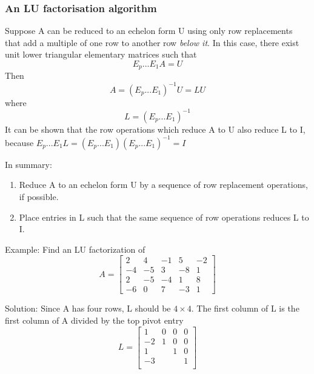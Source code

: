 \documentclass[12pt]{article} %
\begin{document}
\subsubsection{An LU factorisation algorithm}
Suppose A can be reduced to an echelon form U using only row replacements that add a multiple of one row to another row \emph{below it}. In this case, there exist unit lower triangular elementary matrices such that 
$$E_p ... E_1A = U$$
Then 
$$A = (E_p ... E_1)^{-1}U = LU$$
where 
$$L = (E_p ... E_1)^{-1}$$
It can be shown that the row operations which reduce A to U also reduce L to I, because $E_p...E_1L=(E_p...E_1)(E_p...E_1)^{-1} = I$

In summary:
\begin{enumerate}
	\item Reduce A to an echelon form U by a sequence of row replacement operations, if possible.
	\item Place entries in L such that the same sequence of row operations reduces L to I. 
\end{enumerate}

Example:
Find an LU factorization of 
$$A = \begin{bmatrix}
	2 & 4 & -1 & 5 & -2\\
	-4 & -5 & 3 & -8 & 1\\
	2 & -5 & -4 & 1 & 8\\
	-6 & 0 & 7 & -3 & 1
\end{bmatrix}$$


Solution: 
Since A has four rows, L should be $4 \times 4$. The first column of L is the first column of A divided by the top pivot entry
$$L = \begin{bmatrix}
	1 & 0 & 0 & 0\\
	-2 & 1 & 0 & 0\\
	1 & & 1 & 0\\
	-3 & & & 1\\
\end{bmatrix}$$
\end{document}
